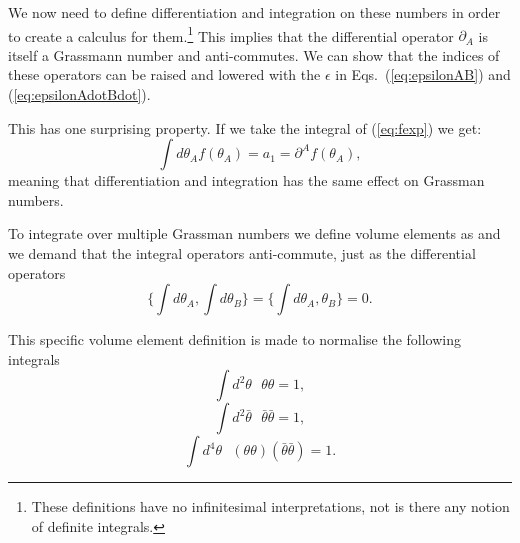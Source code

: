 \documentclass[notes.tex]{subfiles}
\begin{document}
We now need to define differentiation and integration on these numbers in order to create a calculus for them.\footnote{These definitions have no infinitesimal interpretations, not is there any notion of definite integrals.}
 This implies that the differential operator $\partial_A$ is itself a Grassmann number and anti-commutes. We can show that the indices of these operators can be raised and lowered with the $\epsilon$ in Eqs.~(\ref{eq:epsilonAB}) and (\ref{eq:epsilonAdotBdot}).


This has one surprising property. If we take the integral of (\ref{eq:fexp}) we get:
\[\int d\theta_A f(\theta_A) = a_1 = \partial^A f(\theta_A),\]
meaning that differentiation and integration has the same effect on Grassman numbers.

To integrate over multiple Grassman numbers we define volume elements as
and we demand that the integral operators anti-commute, just as the differential operators
\[ \{\int d\theta_A,\int d\theta_B\}=\{\int d\theta_A,\theta_B\}=0.\]


This specific volume element definition is made to normalise the following integrals
\[\int d^2\theta\text{ }\theta\theta = 1,\]
\[\int d^2\bar{\theta}\text{ }\bar{\theta} \bar{\theta} = 1,\]
\[\int d^4 \theta \text{ }(\theta\theta)(\bar{\theta} \bar{\theta}) = 1.\]
\end{document}
